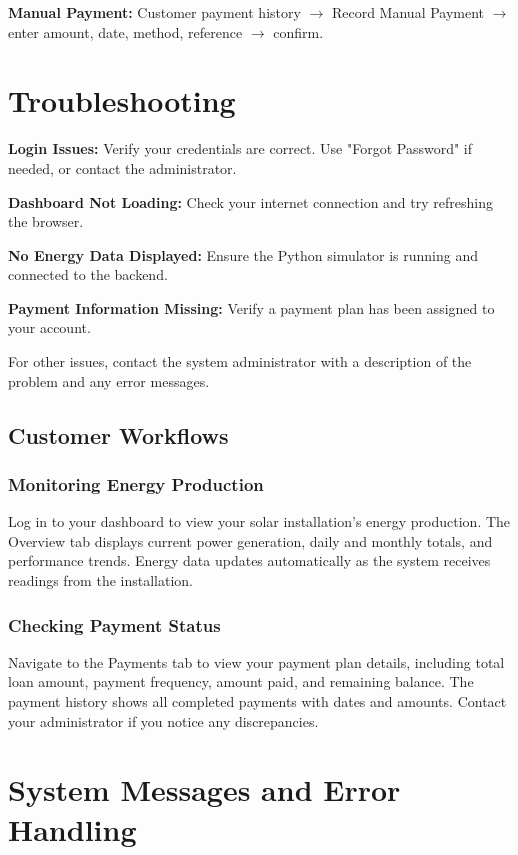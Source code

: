 \textbf{Manual Payment:} Customer payment history $\rightarrow$ Record Manual Payment $\rightarrow$ enter amount, date, method, reference $\rightarrow$ confirm.

\section{Troubleshooting}
\label{sec:troubleshooting}

\textbf{Login Issues:} Verify your credentials are correct. Use "Forgot Password" if needed, or contact the administrator.

\textbf{Dashboard Not Loading:} Check your internet connection and try refreshing the browser.

\textbf{No Energy Data Displayed:} Ensure the Python simulator is running and connected to the backend.

\textbf{Payment Information Missing:} Verify a payment plan has been assigned to your account.

For other issues, contact the system administrator with a description of the problem and any error messages.

\subsection{Customer Workflows}
\label{subsec:customer-workflows}

\subsubsection{Monitoring Energy Production}

Log in to your dashboard to view your solar installation's energy production. The Overview tab displays current power generation, daily and monthly totals, and performance trends. Energy data updates automatically as the system receives readings from the installation.

\subsubsection{Checking Payment Status}

Navigate to the Payments tab to view your payment plan details, including total loan amount, payment frequency, amount paid, and remaining balance. The payment history shows all completed payments with dates and amounts. Contact your administrator if you notice any discrepancies.

\section{System Messages and Error Handling}
\label{sec:system-messages}

